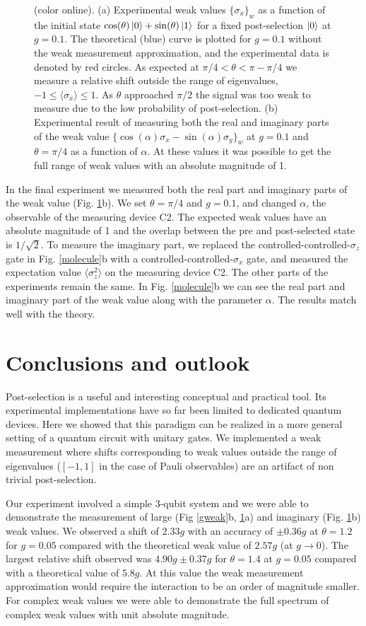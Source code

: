 \documentclass[aps,pra,12pt,onecolumn,showpacs,superscriptaddress,floatfix,footinbib,subfigure]{revtex4}
\def\ket#1{\mathinner{|{#1}\rangle}}
\begin{document}
\begin{figure}[h]
\caption{(color online). (a) Experimental weak values $\{\sigma_x\}_w$ as a function of the initial state $\cos(\theta)\ket{0}+\sin(\theta)\ket{1}$  for a fixed post-selection $\ket{0}$  at $g=0.1$. The theoretical  (blue) curve is plotted for $g=0.1$  without the weak measurement approximation, and the experimental data is denoted by red circles. As expected at  $\pi/4<\theta<\pi-\pi/4$ we measure a relative shift outside the range of eigenvalues, $-1\le\langle\sigma_x\rangle\le1$. As $\theta$ approached $\pi/2$ the signal was too weak to measure due to the low probability of post-selection.  (b) Experimental result of measuring both the real and imaginary parts of the weak value $\{\cos(\alpha)\sigma_x-\sin(\alpha)\sigma_y\}_w$ at $g=0.1$ and $\theta = \pi/4$ as a function of $\alpha$.  At these values it was possible to get the full range of weak values with an absolute magnitude of 1.}\label{thetaweak}
\end{figure}

In the final experiment we  measured both the real part and imaginary parts of the weak value (Fig. \ref{thetaweak}b).  We set $\theta = \pi/4$ and $g=0.1$, and changed $\alpha$, the observable of the measuring device C2. The expected weak values have an absolute magnitude of 1 and the  overlap between the pre and post-selected state is $1/\sqrt{2}$.  To measure the imaginary part, we replaced the controlled-controlled-$\sigma_z$ gate in Fig. \ref{molecule}b with a controlled-controlled-$\sigma_x$ gate, and measured the expectation value $\langle\sigma_z^2\rangle$ on the measuring device C2. The other parts of the experiments remain the same. In  Fig. \ref{molecule}b we can see the real part and imaginary part of the weak value along with the parameter $\alpha$. The results match well with the theory.


\section{Conclusions and outlook}
Post-selection is a useful and interesting conceptual and practical tool. Its experimental implementations have so far  been limited to dedicated quantum devices. Here we showed that this paradigm can be realized in a more general setting of a quantum circuit with unitary gates. We  implemented a weak measurement where shifts corresponding to weak values outside the range of eigenvalues ($[-1,1]$  in the case of Pauli observables) are an artifact of non trivial post-selection.

Our experiment involved a simple 3-qubit system and we were able to demonstrate the measurement of large (Fig  \ref{gweak}b, \ref{thetaweak}a) and imaginary (Fig. \ref{thetaweak}b) weak values.  We observed  a shift of $2.33g$ with an accuracy of $\pm0.36g$  at $\theta=1.2$ for $g=0.05$    compared with the theoretical weak value of  $2.57g$ (at $g\rightarrow 0$). The largest relative shift observed was  $4.90g\pm  0.37g$ for  $\theta=1.4$  at   $g=0.05$ compared with a theoretical value of  $5.8g$. At this value the  weak measurement approximation would require the interaction to be an order of magnitude smaller.   For complex weak values we were able to demonstrate  the full spectrum of complex weak values with unit  absolute magnitude.
\end{document}
